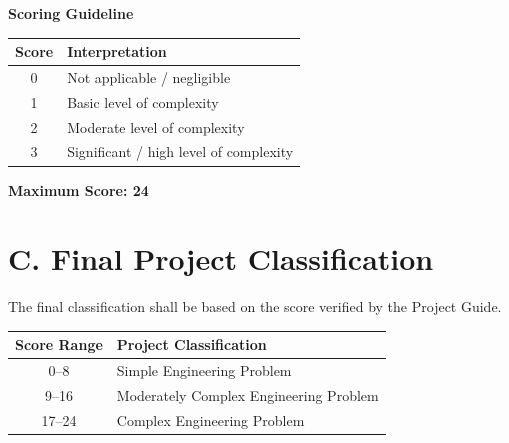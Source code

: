 
\vspace{0.3cm}

\noindent
\textbf{Scoring Guideline}

\vspace{0.1cm}

\begin{center}

\renewcommand{\arraystretch}{1.25}

\begin{tabular}{|c|p{8.5cm}|}
\hline
\textbf{Score} & \textbf{Interpretation} \\
\hline
0 & Not applicable / negligible \\
\hline
1 & Basic level of complexity \\
\hline
2 & Moderate level of complexity \\
\hline
3 & Significant / high level of complexity \\
\hline
\end{tabular}

\end{center}

\vspace{0.3cm}

\noindent
\textbf{Maximum Score: 24}


\section*{C. Final Project Classification}

\noindent
The final classification shall be based on the score verified by the
Project Guide.

\vspace{0.25cm}

\begin{center}

\renewcommand{\arraystretch}{1.4}

\begin{tabular}{|c|p{6.5cm}|}
\hline
\textbf{Score Range} & \textbf{Project Classification} \\
\hline
0--8 & Simple Engineering Problem \\
\hline
9--16 & Moderately Complex Engineering Problem \\
\hline
17--24 & Complex Engineering Problem \\
\hline
\end{tabular}

\end{center}

